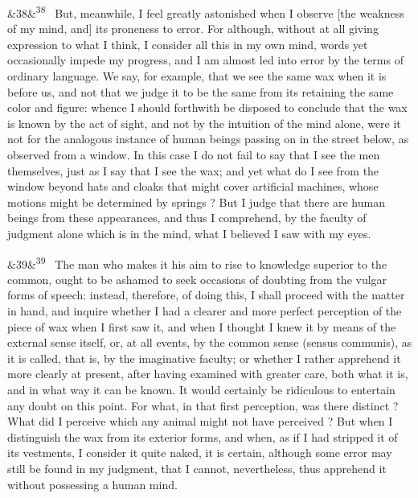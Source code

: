 \documentclass[12pt]{article}
\newcommand{\para}[1][]{\par\noindent\ifx&#1&\else\textsuperscript{\footnotesize #1}~\fi}
\begin{document}
\para[38] But, meanwhile, I feel greatly astonished when I observe [the weakness of my mind, and] its proneness to error. For although, without at all giving expression to what I think, I consider all this in my own mind, words yet occasionally impede my progress, and I am almost led into error by the terms of ordinary language. We say, for example, that we see the same wax when it is before us, and not that we judge it to be the same from its retaining the same color and figure: whence I should forthwith be disposed to conclude that the wax is known by the act of sight, and not by the intuition of the mind alone, were it not for the analogous instance of human beings passing on in the street below, as observed from a window. In this case I do not fail to say that I see the men themselves, just as I say that I see the wax; and yet what do I see from the window beyond hats and cloaks that might cover artificial machines, whose motions might be determined by springs ? But I judge that there are human beings from these appearances, and thus I comprehend, by the faculty of judgment alone which is in the mind, what I believed I saw with my eyes.

\para[39] The man who makes it his aim to rise to knowledge superior to the common, ought to be ashamed to seek occasions of doubting from the vulgar forms of speech: instead, therefore, of doing this, I shall proceed with the matter in hand, and inquire whether I had a clearer and more perfect perception of the piece of wax when I first saw it, and when I thought I knew it by means of the external sense itself, or, at all events, by the common sense (sensus communis), as it is called, that is, by the imaginative faculty; or whether I rather apprehend it more clearly at present, after having examined with greater care, both what it is, and in what way it can be known. It would certainly be ridiculous to entertain any doubt on this point. For what, in that first perception, was there distinct ? What did I perceive which any animal might not have perceived ? But when I distinguish the wax from its exterior forms, and when, as if I had stripped it of its vestments, I consider it quite naked, it is certain, although some error may still be found in my judgment, that I cannot, nevertheless, thus apprehend it without possessing a human mind.
\end{document}
